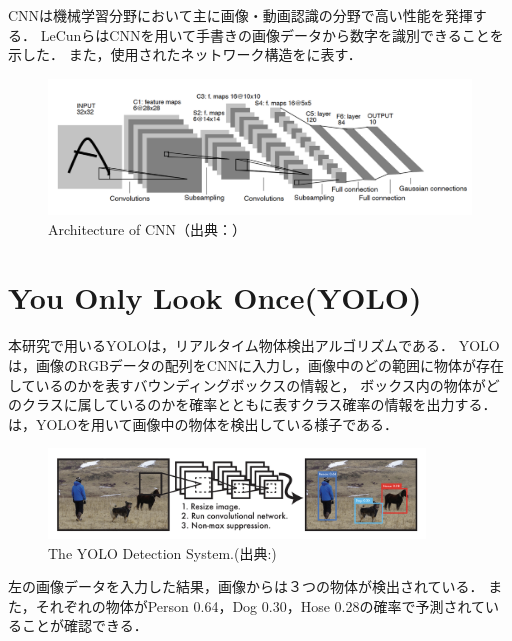 \documentclass[../main]{subfiles}
\begin{document}
        CNNは機械学習分野において主に画像・動画認識の分野で高い性能を発揮する．
        LeCunら\cite{cnn_paper}はCNNを用いて手書きの画像データから数字を識別できることを示した．
        また，使用されたネットワーク構造をに表す．

        \begin{figure}[H]
         \centering
         \includegraphics[width=15cm]{../images/cnn_exp.png}
         \caption{Architecture of CNN（出典：\cite{cnn_paper}）}
         \label{figure::cnn}
        \end{figure}

        \newpage

        \section{You Only Look Once(YOLO)}
        本研究で用いるYOLO\cite{yolo_paper_v1}\cite{yolo_paper_v2}\cite{yolo_paper_v3}\cite{yolo_paper_v4}は，リアルタイム物体検出アルゴリズムである．
        YOLOは，画像のRGBデータの配列をCNNに入力し，画像中のどの範囲に物体が存在しているのかを表すバウンディングボックスの情報と，
        ボックス内の物体がどのクラスに属しているのかを確率とともに表すクラス確率の情報を出力する．
        は，YOLOを用いて画像中の物体を検出している様子である． 

        \begin{figure}[H]
        \centering
        \includegraphics[width=10cm]{../images/yolo_exp.png}
        \caption{The YOLO Detection System.(出典:\cite{yolo_paper_v1})}
        \label{figure::yolo_exp}
        \end{figure}
        左の画像データを入力した結果，画像からは３つの物体が検出されている．
        また，それぞれの物体がPerson 0.64，Dog 0.30，Hose 0.28の確率で予測されていることが確認できる．
    
\end{document}
